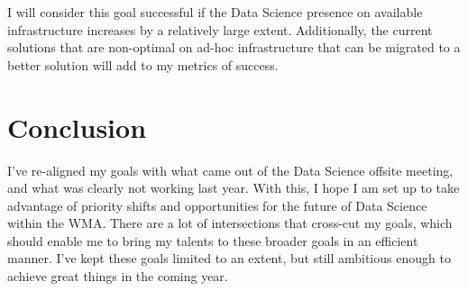 \documentclass{article}
\begin{document}
I will consider this goal successful if the Data Science presence on available infrastructure increases by a relatively large extent.
Additionally, the current solutions that are non-optimal on ad-hoc infrastructure that can be migrated to a better solution will add to my metrics of success.

\section{Conclusion}

I've re-aligned my goals with what came out of the Data Science offsite meeting, and what was clearly not working last year.
With this, I hope I am set up to take advantage of priority shifts and opportunities for the future of Data Science within the WMA.
There are a lot of intersections that cross-cut my goals, which should enable me to bring my talents to these broader goals in an efficient manner.
I've kept these goals limited to an extent, but still ambitious enough to achieve great things in the coming year.
\end{document}
